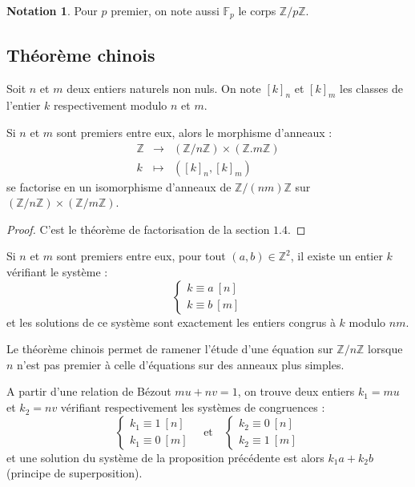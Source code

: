 \documentclass[french]{article}
\newcommand{\Z}{\mathbb{Z}}
\newcommand{\F}{\mathbb{F}}
\theoremstyle{plain}
\theoremstyle{definition}
\newtheorem*{notation}{Notation}
\theoremstyle{remark}
\begin{document}
\begin{notation}
	Pour $p$ premier, on note aussi $\F_p$ le corps $\Z/p\Z$.
\end{notation}

\subsection{Théorème chinois}

Soit $n$ et $m$ deux entiers naturels non nuls. On note $[k]_n$ et $[k]_m$ les classes de l'entier $k$ respectivement modulo $n$ et $m$.

\begin{prop}%
	Si $n$ et $m$ sont premiers entre eux, alors le morphisme d'anneaux :
	$$\begin{array}{rcl}
		\Z&\longrightarrow&(\Z/n\Z)\times(\Z.m\Z)\\
		k&\longmapsto&([k]_n,[k]_m)
	\end{array}$$
	se factorise en un isomorphisme d'anneaux de $\Z/(nm)\Z$ sur $(\Z/n\Z)\times(\Z/m\Z)$.
\end{prop}
\begin{proof}
	C'est le théorème de factorisation de la section $1.4$.
\end{proof}

\begin{prop}%
	Si $n$ et $m$ sont premiers entre eux, pour tout $(a,b)\in\Z^2$, il existe un entier $k$ vérifiant le système :
	$$\begin{cases}
		k\equiv a\ [n]\\
		k\equiv b\ [m]
	\end{cases}$$ et les solutions de ce système sont exactement les entiers congrus à $k$ modulo $nm$.
\end{prop}

Le théorème chinois permet de ramener l'étude d'une équation sur $\Z/n\Z$ lorsque $n$ n'est pas premier à celle d'équations sur des anneaux plus simples.

\begin{met}
	A partir d'une relation de Bézout $mu+nv=1$, on trouve deux entiers $k_1=mu$ et $k_2=nv$ vérifiant respectivement les systèmes de congruences : 
	$$\begin{cases}
		k_1\equiv 1\ [n]\\
		k_1\equiv 0\ [m]
	\end{cases}\quad\text{et}\quad \begin{cases}
	k_2\equiv 0\ [n]\\
	k_2\equiv 1\ [m]
	\end{cases}$$ et une solution du système de la proposition précédente est alors $k_1a+k_2b$ (principe de superposition).
\end{met}
\end{document}
